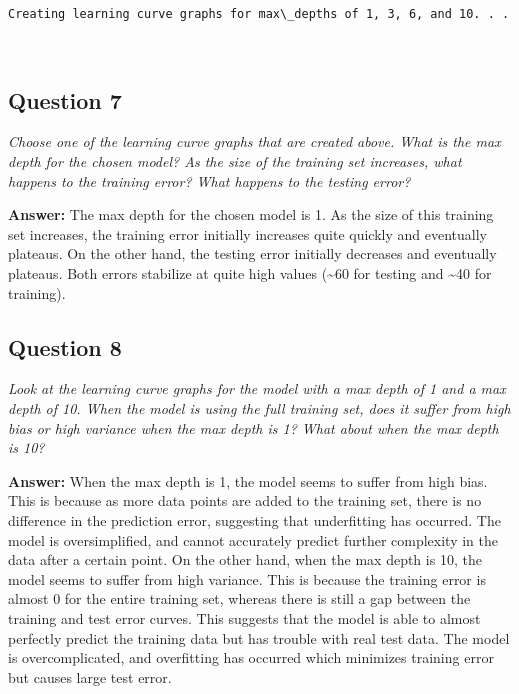 \documentclass{article}
\begin{document}
    \begin{Verbatim}[commandchars=\\\{\}]
Creating learning curve graphs for max\_depths of 1, 3, 6, and 10. . .
    \end{Verbatim}

    \begin{center}
    \end{center}
    { \hspace*{\fill} \\}
    
    \subsection{Question 7}\label{question-7}

\emph{Choose one of the learning curve graphs that are created above.
What is the max depth for the chosen model? As the size of the training
set increases, what happens to the training error? What happens to the
testing error?}

    \textbf{Answer: } The max depth for the chosen model is 1. As the size
of this training set increases, the training error initially increases
quite quickly and eventually plateaus. On the other hand, the testing
error initially decreases and eventually plateaus. Both errors stabilize
at quite high values (\textasciitilde{}60 for testing and
\textasciitilde{}40 for training).

    \subsection{Question 8}\label{question-8}

\emph{Look at the learning curve graphs for the model with a max depth
of 1 and a max depth of 10. When the model is using the full training
set, does it suffer from high bias or high variance when the max depth
is 1? What about when the max depth is 10?}

    \textbf{Answer: } When the max depth is 1, the model seems to suffer
from high bias. This is because as more data points are added to the
training set, there is no difference in the prediction error, suggesting
that underfitting has occurred. The model is oversimplified, and cannot
accurately predict further complexity in the data after a certain point.
On the other hand, when the max depth is 10, the model seems to suffer
from high variance. This is because the training error is almost 0 for
the entire training set, whereas there is still a gap between the
training and test error curves. This suggests that the model is able to
almost perfectly predict the training data but has trouble with real
test data. The model is overcomplicated, and overfitting has occurred
which minimizes training error but causes large test error.
\end{document}
